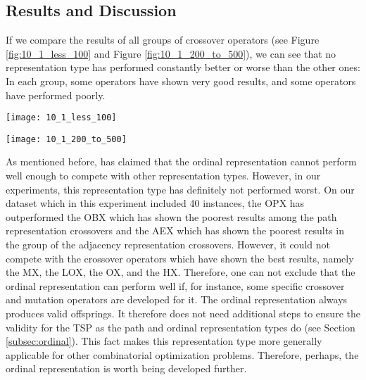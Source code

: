 \subsection{Results and Discussion}

If we compare the results of all groups of crossover operators (see Figure \ref{fig:10_1_less_100} and Figure \ref{fig:10_1_200_to_500}), we can see that no representation type has performed constantly better or worse than the other ones: In each group, some operators have shown very good results, and some operators have performed poorly.\par 

\begin{sidewaysfigure}[htp] \centering
	\texttt{[image: 10\_1\_less\_100]}
	\caption{Results for 22 instances with less than 100 cities for different representation types crossovers combined with 6 mutation operators.}
	\label{fig:10_1_less_100}
\end{sidewaysfigure}	

\begin{sidewaysfigure}[htp] \centering
	\texttt{[image: 10\_1\_200\_to\_500]}
	\caption{Results for 18 instances with 200 to 500 cities for different representation types crossovers combined with 6 mutation operators.}
	\label{fig:10_1_200_to_500}
\end{sidewaysfigure}

As mentioned before, \citeauthor{potvin1996genetic} \cite{potvin1996genetic} has claimed that the ordinal representation cannot perform well enough to compete with other representation types. However, in our experiments, this representation type has definitely not performed worst. On our dataset which in this experiment included 40 instances, the OPX has outperformed the OBX which has shown the poorest results among the path representation crossovers and the AEX which has shown the poorest results in the group of the adjacency representation crossovers.  However, it could not compete with the crossover operators which have shown the best results, namely the MX, the LOX, the OX, and the HX. Therefore, one can not exclude that the ordinal representation can perform well if, for instance, some specific crossover and mutation operators are developed for it. The ordinal representation  always produces valid offsprings. It therefore does not need additional steps to ensure the validity for the TSP as the path and ordinal representation types do (see Section \ref{subsec:ordinal}). This fact makes this representation type more generally applicable for other combinatorial optimization problems. Therefore, perhaps, the ordinal representation is worth being developed further.\par 

